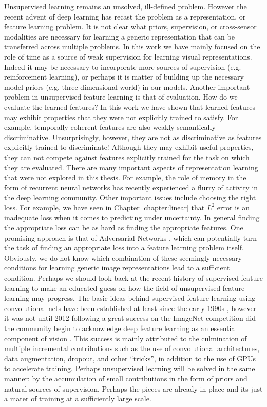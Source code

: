 Unsupervised learning remains an unsolved, ill-defined problem. However the
recent advent of deep learning has recast the problem as a representation, or
feature learning problem. It is not clear what priors, supervision, or
cross-sensor modalities are necessary for learning a generic representation
that can be transferred across multiple problems.  In this work we have mainly
focused on the role of time as a source of weak supervision for learning visual
representations. Indeed it may be necessary to incorporate more sources of
supervision (e.g. reinforcement learning), or perhaps it is matter of building
up the necessary model priors (e.g. three-dimensional world) in our models.
Another important problem in unsupervised feature learning is that of
evaluation. How do we evaluate the learned features?  In this work we have
shown that learned features may exhibit properties that they were not
explicitly trained to satisfy. For example, temporally coherent features are
also weakly semantically discriminative. Unsurprisingly, however, they are not
as discriminative as features explicitly trained to discriminate! Although they
may exhibit useful properties, they can not compete against features
explicitly trained for the task on which they are evaluated. There are many
important aspects of representation learning that were not explored in this
thesis. For example, the role of memory in the form of recurrent neural
networks has recently experienced a flurry of activity in the deep learning
community. Other important issues include choosing the right loss. For example,
we have seen in Chapter \ref{chapter:linear} that $L^2$ error is an inadequate
loss when it comes to predicting under uncertainty. In general finding the
appropriate loss can be as hard as finding the appropriate features. One
promising approach is that of Adversarial Networks \cite{goodfellow2014}, which
can potentially turn the task of finding an appropriate loss into a feature
learning problem itself. Obviously, we do not know which combination of these
seemingly necessary conditions for learning generic image representations lead
to a sufficient condition. Perhaps we should look back at the recent history of
supervised feature learning to make an educated guess on how the field of
unsupervised feature learning may progress. The basic ideas behind supervised
feature learning using convolutional nets  have been established at least since
the early 1990s \cite{lecun1995,fukushima1980}, however it was not until 2012 following
a great success on the ImageNet competition did the community begin
to acknowledge deep feature learning as an essential component of vision
\cite{ImageNet}. This success is mainly attributed to the culmination
of multiple incremental contributions such as the use of convolutional
architectures, data augmentation, dropout, and other ``tricks'', in addition to
the use of GPUs to accelerate training. Perhaps unsupervised learning will be
solved in the same manner: by the accumulation of small contributions in the
form of priors and natural sources of supervision.  Perhaps the pieces are
already in place and its just a mater of training at a sufficiently large
scale. 
   
